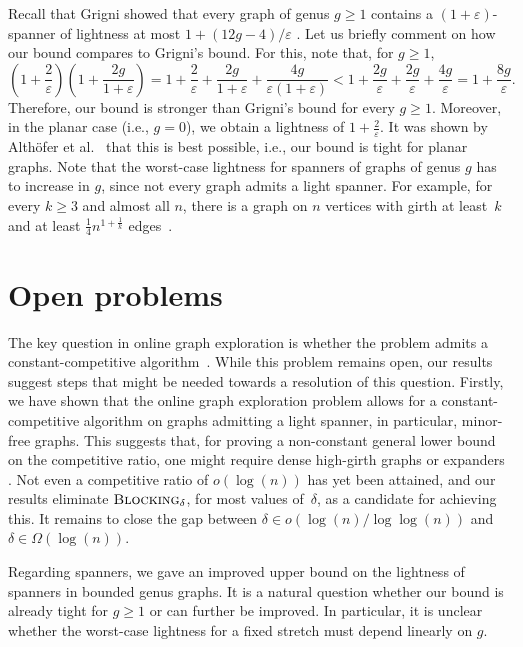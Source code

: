 \documentclass[a4paper,cleveref, autoref, thm-restate, thm-restate, UKenglish]{lipics-v2021}
\newcommand{\blocking}{\textsc{Blocking}}
\renewcommand{\epsilon}{\varepsilon}
\begin{document}
Recall that Grigni showed that every graph of genus $g\geq 1$ contains a $(1+\epsilon)$-spanner of lightness at most  $1+(12g-4)/\epsilon$ \cite{grigni}.
Let us briefly comment on how our bound compares to Grigni's bound. For this, note that, for $g\geq 1$,
\begin{equation*}
 \left( 1+\frac{2}{\epsilon} \right) \left( 1+ \frac{2g}{1+\epsilon} \right)
 = 1 + \frac{2}{\epsilon} + \frac{2g}{1+\epsilon} + \frac{4g}{\epsilon (1+\epsilon)} 
 < 1 + \frac{2g}{\epsilon} + \frac{2g}{\epsilon} + \frac{4g}{\epsilon} = 1+\frac{8g}{\epsilon}.
\end{equation*}
Therefore, our bound is stronger than Grigni's bound for every $g\geq 1$. Moreover, in \linebreak the  planar case (i.e., $g=0$), we obtain a lightness of $1+\frac{2}{\epsilon}$. It was shown by \linebreak Althöfer et al.~\cite[Theorem 5]{althoefer} that this is best possible, i.e., our bound is tight for planar graphs.
Note that the worst-case lightness for spanners of graphs of genus $g$ has to increase in $g$, since not every graph admits a light spanner.
For example, for every $k\geq 3$ and almost all $n$, there is a graph on $n$ vertices with girth at least~$k$ and at least $\frac{1}{4}n^{1+\frac{1}{k}}$ edges~\hbox{\cite[Theorem 6.6]{mitzenmacher}}.


\section{Open problems}
The key question in online graph exploration is whether the problem admits a constant-competitive algorithm~\cite{pruhs94}. 
While this problem remains open, our results suggest steps that might be needed towards a resolution of this question.
Firstly, we have shown that the online graph exploration problem allows for a constant-competitive algorithm on graphs admitting a light spanner, in particular, minor-free graphs. 
This suggests that, for proving a non-constant general lower bound on the competitive ratio, one might require dense high-girth graphs or expanders \cite{krivelevich}.
Not even a competitive ratio of $o(\log (n))$ has yet been attained, and our results eliminate $\blocking_\delta$, for most values of~$\delta$, as a candidate for achieving this.
It remains to close the gap between $\delta \in o(\log (n)/ \log \log (n))$ and $\delta \in \Omega(\log (n))$.

Regarding spanners, we gave an improved upper bound on the lightness of spanners in bounded genus graphs.
It is a natural question whether our bound is already tight for $g\geq 1$ or can further be improved.
In particular, it is unclear whether the worst-case lightness for a fixed stretch must depend linearly on $g$.

\newpage

\newpage
\end{document}
